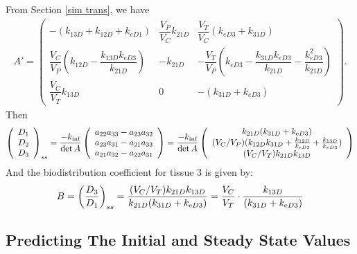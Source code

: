 From Section \ref{sim trans}, we have 
\begin{align*}
A' = \begin{pmatrix}
-(k_{13D} + k_{12D} + k_{eD1})                                          & \dfrac{V_P}{V_C}k_{21D} & \dfrac{V_T}{V_C}(k_{eD3} + k_{31D}) \\
\dfrac{V_C}{V_P}\left(k_{12D} - \dfrac{k_{13D}k_{eD3}}{k_{21D}}\right)  & -k_{21D}                & -\dfrac{V_T}{V_P}\left(k_{eD3} - \dfrac{k_{31D}k_{eD3}}{k_{21D}} - \dfrac{k_{eD3}^2}{k_{21D}}\right) \\
\dfrac{V_C}{V_T}k_{13D}                                                 & 0                       & -(k_{31D} + k_{eD3})
\end{pmatrix}.
\end{align*}
Then 
\begin{align*}
\left(\begin{array}{c}
D_{1}\\
D_{2}\\
D_{3}
\end{array}\right)_{ss} = \frac{-k_{\text{inf}}}{\det A} \left(\begin{array}{c}
a_{22}a_{33}-a_{23}a_{32}\\
a_{23}a_{31}-a_{21}a_{33}\\
a_{21}a_{32}-a_{22}a_{31}
\end{array}\right) = \frac{-k_{\text{inf}}}{\det A} \left(\begin{array}{c}
k_{21D}(k_{31D} + k_{\text{e} D3})\\
(V_{C}/V_{P})(k_{12D}k_{31D} + \frac{k_{12D}}{k_{eD3}} + \frac{k_{13D}}{k_{eD3}})\\
(V_{C}/V_{T})k_{21D}k_{13D}
\end{array}\right)
\end{align*}
And the biodistribution coefficient for tissue 3 is given by:
\begin{align*}
B = \left(\frac{D_{3}}{D_{1}}\right)_{ss} = \frac{(V_{C}/V_{T})k_{21D}k_{13D}} {k_{21D}(k_{31D} + k_{\text{e} D3})} = \frac{V_{C}}{V_{T}}\cdot\frac{k_{13D}}{(k_{31D} + k_{\text{e} D3})}    
\end{align*}



\subsection{Predicting The Initial and Steady State Values} \label{initial and steady state values}



